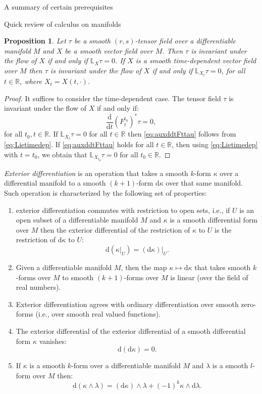 \documentclass[oneside,a4paper,11pt]{amsbook}
\newcommand{\R}{\mathds R}
\newcommand{\dd}{\mathrm d}
\theoremstyle{remark}\newtheorem{exercise}{Exercise}[chapter]
\theoremstyle{plain}\newtheorem{teo}{Theorem}[section]
\theoremstyle{plain}\newtheorem{lem}[teo]{Lemma}
\theoremstyle{plain}\newtheorem{prop}[teo]{Proposition}
\theoremstyle{plain}\newtheorem{cor}[teo]{Corollary}
\theoremstyle{definition}\newtheorem{defin}[teo]{Definition}
\theoremstyle{remark}\newtheorem{rem}[teo]{Remark}
\theoremstyle{definition}\newtheorem{notation}[teo]{Notation}
\theoremstyle{definition}\newtheorem{convention}[teo]{Convention}
\theoremstyle{definition}\newtheorem{example}[teo]{Example}
\numberwithin{section}{chapter}
\numberwithin{equation}{section}
\begin{document}
\begin{chapter}{A summary of certain prerequisites}
\begin{section}{Quick review of calculus on manifolds}
\begin{prop}\label{thm:invariantflowLie}
Let $\tau$ be a smooth $(r,s)$-tensor field over a differentiable manifold $M$ and $X$ be a smooth vector field over $M$.
Then $\tau$ is invariant under the flow of $X$ if and only if $\mathbb L_X\tau=0$. If $X$ is a smooth time-dependent
vector field over $M$ then $\tau$ is invariant under the flow of $X$ if and only if $\mathbb L_{X_t}\tau=0$,
for all $t\in\R$, where $X_t=X(t,\cdot)$.
\end{prop}
\begin{proof}
It suffices to consider the time-dependent case. The tensor field $\tau$ is invariant under the flow of $X$ if and only
if:
\begin{equation}\label{eq:auxddtFttau}
\frac{\dd}{\dd t}(F^{t_0}_t)^*\tau=0,
\end{equation}
for all $t_0,t\in\R$. If $\mathbb L_{X_t}\tau=0$ for all $t\in\R$ then \eqref{eq:auxddtFttau} follows from \eqref{eq:Lietimedep}.
If \eqref{eq:auxddtFttau} holds for all $t\in\R$, then using \eqref{eq:Lietimedep} with $t=t_0$, we obtain
that $\mathbb L_{X_{t_0}}\tau=0$ for all $t_0\in\R$.
\end{proof}

{\em Exterior differentiation\/} is an operation that takes a smooth $k$-form $\kappa$ over a differential manifold to a smooth $(k+1)$-form
$\dd\kappa$ over that same manifold. Such operation is characterized by the following set of properties:
\begin{enumerate}
\item\label{itm:extdifopen}
exterior differentiation commutes with restriction to open sets, i.e., if $U$ is an open subset of a differentiable manifold $M$ and $\kappa$ is
a smooth differential form over $M$ then the exterior differential of the restriction of $\kappa$ to $U$ is the restriction of $\dd\kappa$ to $U$:
\[\dd(\kappa\vert_U)=(\dd\kappa)\vert_U.\]
\item Given a differentiable manifold $M$, then the map $\kappa\mapsto\dd\kappa$ that takes smooth $k$-forms over $M$ to smooth $(k+1)$-forms
over $M$ is linear (over the field of real numbers).
\item Exterior differentiation agrees with ordinary differentiation over smooth zero-forms (i.e., over smooth real valued functions).
\item\label{itm:ddzero} The exterior differential of the exterior differential of a smooth differential form $\kappa$ vanishes:
\[\dd(\dd\kappa)=0.\]
\item\label{itm:extdifwedge}
If $\kappa$ is a smooth $k$-form over a differentiable manifold $M$ and $\lambda$ is a smooth $l$-form over $M$ then:
\[\dd(\kappa\wedge\lambda)=(\dd\kappa)\wedge\lambda+(-1)^k\kappa\wedge\dd\lambda.\]
\end{enumerate}


\end{section}
\end{chapter}
\end{document}
